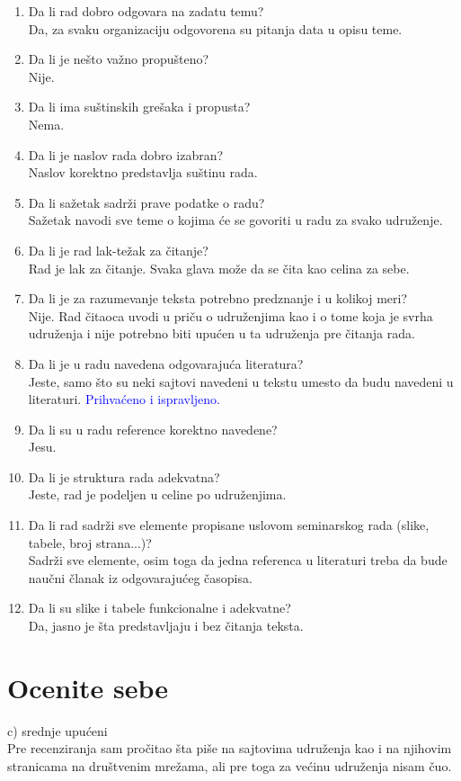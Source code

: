 \documentclass[a4paper]{report}
\newcommand{\odgovor}[1]{\textcolor{blue}{#1}}
\begin{document}
\begin{enumerate}
\item Da li rad dobro odgovara na zadatu temu?\\
Da, za svaku organizaciju odgovorena su pitanja data u opisu teme.
\item Da li je nešto važno propušteno?\\
Nije.
\item Da li ima suštinskih grešaka i propusta?\\
Nema.
\item Da li je naslov rada dobro izabran?\\
Naslov korektno predstavlja suštinu rada.
\item Da li sažetak sadrži prave podatke o radu?\\
Sažetak navodi sve teme o kojima će se govoriti u radu za svako udruženje.
\item Da li je rad lak-težak za čitanje?\\
Rad je lak za čitanje. Svaka glava može da se čita kao celina za sebe.
\item Da li je za razumevanje teksta potrebno predznanje i u kolikoj meri?\\
Nije. Rad čitaoca uvodi u priču o udruženjima kao i o tome koja je svrha udruženja i nije potrebno biti upućen u ta udruženja pre čitanja rada.
\item Da li je u radu navedena odgovarajuća literatura?\\
Jeste, samo što su neki sajtovi navedeni u tekstu umesto da budu navedeni u literaturi.
\odgovor{Prihvaćeno i ispravljeno.}
\item Da li su u radu reference korektno navedene?\\
Jesu.
\item Da li je struktura rada adekvatna?\\
Jeste, rad je podeljen u celine po udruženjima.
\item Da li rad sadrži sve elemente propisane uslovom seminarskog rada (slike, tabele, broj strana...)?\\
Sadrži sve elemente, osim toga da jedna referenca u literaturi treba da bude naučni članak iz odgovarajućeg časopisa.
\odgovor{} %
\item Da li su slike i tabele funkcionalne i adekvatne?\\
Da, jasno je šta predstavljaju i bez čitanja teksta.
\end{enumerate}

\section{Ocenite sebe}
c) srednje upućeni\\
Pre recenziranja sam pročitao šta piše na sajtovima udruženja kao i na njihovim stranicama na društvenim mrežama, ali pre toga za većinu udruženja nisam čuo.
\end{document}
